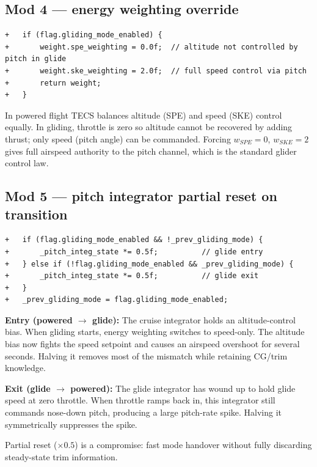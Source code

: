\documentclass[12pt,a4paper]{article}
\begin{document}
\subsection{Mod 4 — energy weighting override}

\begin{lstlisting}[style=diff]
+	if (flag.gliding_mode_enabled) {
+		weight.spe_weighting = 0.0f;  // altitude not controlled by pitch in glide
+		weight.ske_weighting = 2.0f;  // full speed control via pitch
+		return weight;
+	}
\end{lstlisting}
\begin{annotation}In powered flight TECS balances altitude (SPE) and speed (SKE) control equally. In gliding, throttle is zero so altitude cannot be recovered by adding thrust; only speed (pitch angle) can be commanded. Forcing $w_{SPE}=0$, $w_{SKE}=2$ gives full airspeed authority to the pitch channel, which is the standard glider control law.\end{annotation}

\subsection{Mod 5 — pitch integrator partial reset on transition}

\begin{lstlisting}[style=diff]
+	if (flag.gliding_mode_enabled && !_prev_gliding_mode) {
+		_pitch_integ_state *= 0.5f;          // glide entry
+	} else if (!flag.gliding_mode_enabled && _prev_gliding_mode) {
+		_pitch_integ_state *= 0.5f;          // glide exit
+	}
+	_prev_gliding_mode = flag.gliding_mode_enabled;
\end{lstlisting}
\begin{annotation}\textbf{Entry (powered $\to$ glide):} The cruise integrator holds an altitude-control bias. When gliding starts, energy weighting switches to speed-only. The altitude bias now fights the speed setpoint and causes an airspeed overshoot for several seconds. Halving it removes most of the mismatch while retaining CG/trim knowledge.

\textbf{Exit (glide $\to$ powered):} The glide integrator has wound up to hold glide speed at zero throttle. When throttle ramps back in, this integrator still commands nose-down pitch, producing a large pitch-rate spike. Halving it symmetrically suppresses the spike.

Partial reset ($\times 0.5$) is a compromise: fast mode handover without fully discarding steady-state trim information.\end{annotation}
\end{document}
